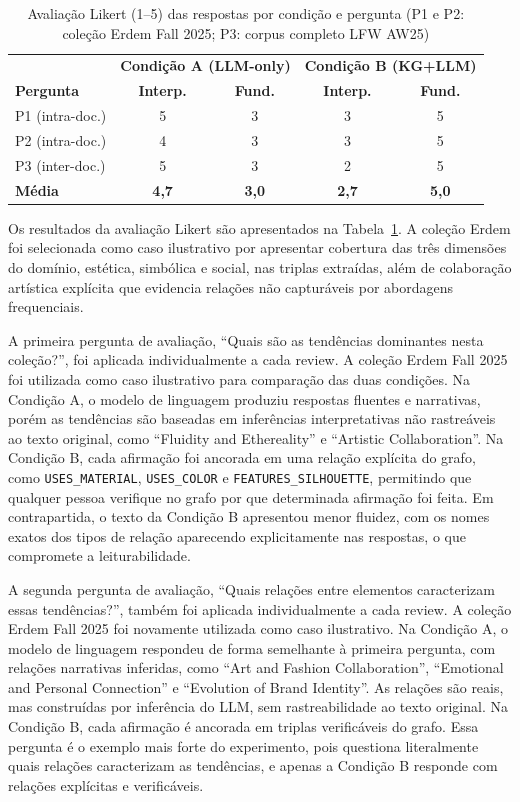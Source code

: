 \documentclass[sigconf]{acmart}
\begin{document}
\begin{table}[h]
\caption{Avaliação Likert (1--5) das respostas por condição e pergunta (P1 e P2: coleção Erdem Fall 2025; P3: corpus completo LFW AW25)}
\label{tab:likert}
\begin{tabular}{lcccc}
\hline
 & \multicolumn{2}{c}{\textbf{Condição A (LLM-only)}} & \multicolumn{2}{c}{\textbf{Condição B (KG+LLM)}} \\
\textbf{Pergunta} & \textbf{Interp.} & \textbf{Fund.} & \textbf{Interp.} & \textbf{Fund.} \\
\hline
P1 (intra-doc.) & 5 & 3 & 3 & 5 \\
P2 (intra-doc.) & 4 & 3 & 3 & 5 \\
P3 (inter-doc.) & 5 & 3 & 2 & 5 \\
\hline
\textbf{Média} & \textbf{4,7} & \textbf{3,0} & \textbf{2,7} & \textbf{5,0} \\
\hline
\end{tabular}
\end{table}

Os resultados da avaliação Likert são apresentados na Tabela~\ref{tab:likert}. A coleção Erdem foi selecionada como caso ilustrativo por apresentar cobertura das três dimensões do domínio, estética, simbólica e social, nas triplas extraídas, além de colaboração artística explícita que evidencia relações não capturáveis por abordagens frequenciais.

A primeira pergunta de avaliação, ``Quais são as tendências dominantes nesta coleção?'', foi aplicada individualmente a cada review. A coleção Erdem Fall 2025 foi utilizada como caso ilustrativo para comparação das duas condições. Na Condição A, o modelo de linguagem produziu respostas fluentes e narrativas, porém as tendências são baseadas em inferências interpretativas não rastreáveis ao texto original, como ``Fluidity and Ethereality'' e ``Artistic Collaboration''. Na Condição B, cada afirmação foi ancorada em uma relação explícita do grafo, como \texttt{USES\_MATERIAL}, \texttt{USES\_COLOR} e \texttt{FEATURES\_SILHOUETTE}, permitindo que qualquer pessoa verifique no grafo por que determinada afirmação foi feita. Em contrapartida, o texto da Condição B apresentou menor fluidez, com os nomes exatos dos tipos de relação aparecendo explicitamente nas respostas, o que compromete a leiturabilidade.

A segunda pergunta de avaliação, ``Quais relações entre elementos caracterizam essas tendências?'', também foi aplicada individualmente a cada review. A coleção Erdem Fall 2025 foi novamente utilizada como caso ilustrativo. Na Condição A, o modelo de linguagem respondeu de forma semelhante à primeira pergunta, com relações narrativas inferidas, como ``Art and Fashion Collaboration'', ``Emotional and Personal Connection'' e ``Evolution of Brand Identity''. As relações são reais, mas construídas por inferência do LLM, sem rastreabilidade ao texto original. Na Condição B, cada afirmação é ancorada em triplas verificáveis do grafo. Essa pergunta é o exemplo mais forte do experimento, pois questiona literalmente quais relações caracterizam as tendências, e apenas a Condição B responde com relações explícitas e verificáveis.
\end{document}

